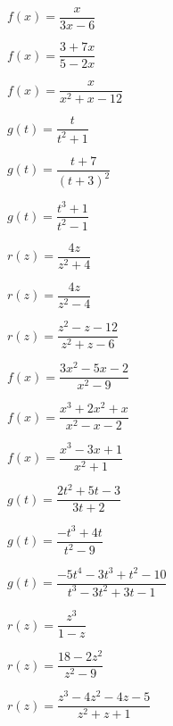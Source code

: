 \begin{exenum}
\begin{ifigure}
\caption{}
\label{fig:findformula1overxsquaredgraphlast}
\end{ifigure}

\end{exenum}


\begin{shortexenum}[MMMMMM]
\item $f(x) = \dfrac{x}{3x - 6}$ \label{alltheasympfirst}
\item $f(x) = \dfrac{3 + 7x}{5 - 2x}$
\item $f(x) = \dfrac{x}{x^{2} + x - 12}$
\item $g(t) = \dfrac{t}{t^{2} + 1}$
\item $g(t) = \dfrac{t + 7}{(t + 3)^{2}}$
\item $g(t) = \dfrac{t^{3} + 1}{t^{2} - 1}$
\item $r(z) = \dfrac{4z}{z^2+4}$
\item $r(z) = \dfrac{4z}{z^2-4}$
\item $r(z) = \dfrac{z^2-z-12}{z^2+z-6}$
\item $f(x) = \dfrac{3x^2-5x-2}{x^2-9}$
\item $f(x) = \dfrac{x^3+2x^2+x}{x^2-x-2}$
\item $f(x) = \dfrac{x^{3} - 3x + 1}{x^{2} + 1}$
\item $g(t) = \dfrac{2t^{2} + 5t - 3}{3t + 2}$
\item $g(t) = \dfrac{-t^{3} + 4t}{t^{2} - 9}$
\item \small $g(t) = \dfrac{-5t^{4} - 3t^{3} + t^{2} - 10}{t^{3} - 3t^{2} + 3t - 1}$ \normalsize
\item $r(z) = \dfrac{z^3}{1-z}$
\item $r(z) = \dfrac{18-2z^2}{z^2-9}$
\item $r(z) = \dfrac{z^3-4z^2-4z-5}{z^2+z+1}$ \label{alltheasymplast}
\end{shortexenum}

